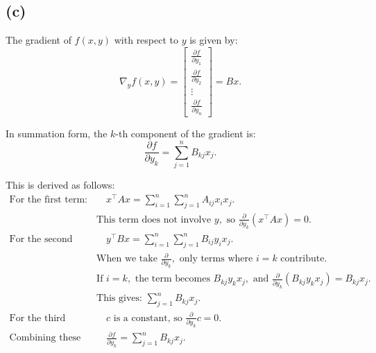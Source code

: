 \documentclass{article}
\begin{document}
\subsection*{(c)}
The gradient of \(f(x, y)\) with respect to \(y\) is given by:
\[
\nabla_y f(x, y) = \begin{bmatrix}
\frac{\partial f}{\partial y_1} \\
\frac{\partial f}{\partial y_2} \\
\vdots \\
\frac{\partial f}{\partial y_n}
\end{bmatrix}
= B x.
\]

In summation form, the \(k\)-th component of the gradient is:
\[
\frac{\partial f}{\partial y_k} = \sum_{j=1}^n B_{kj} x_j.
\]

This is derived as follows:
\begin{align*}
\text{For the first term: } & \quad 
x^\top A x = \sum_{i=1}^n \sum_{j=1}^n A_{ij} x_i x_j. \\
& \text{This term does not involve } y, \text{ so } \frac{\partial}{\partial y_k}(x^\top A x) = 0. \\[10pt]
\text{For the second term: } & \quad 
y^\top B x = \sum_{i=1}^n \sum_{j=1}^n B_{ij} y_i x_j. \\
& \text{When we take } \frac{\partial}{\partial y_k}, \text{ only terms where } i = k \text{ contribute.} \\
& \text{If } i = k, \text{ the term becomes } B_{kj} y_k x_j, \text{ and } \frac{\partial}{\partial y_k}(B_{kj} y_k x_j) = B_{kj} x_j. \\
& \text{This gives: } \sum_{j=1}^n B_{kj} x_j. \\[10pt]
\text{For the third term: } & \quad 
c \text{ is a constant, so } \frac{\partial}{\partial y_k} c = 0. \\[10pt]
\text{Combining these results: } & \quad 
\frac{\partial f}{\partial y_k} = \sum_{j=1}^n B_{kj} x_j.
\end{align*}
\end{document}
